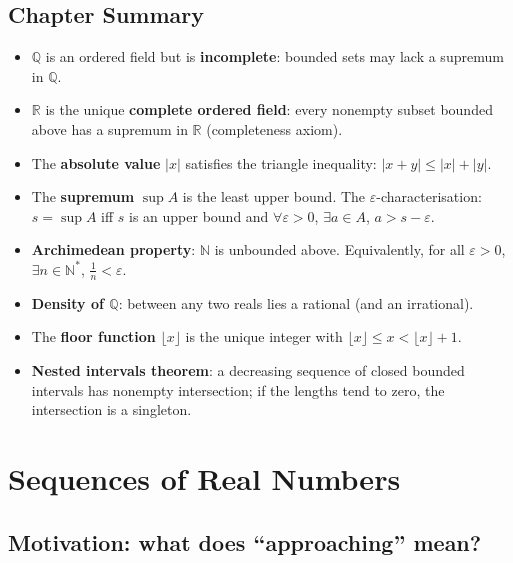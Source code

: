 \documentclass[12pt,a4paper,openany]{book}
\newcommand{\N}{\mathbb{N}}
\newcommand{\Q}{\mathbb{Q}}
\newcommand{\R}{\mathbb{R}}
\newcommand{\eps}{\varepsilon}
\newcommand{\abs}[1]{\left\lvert #1 \right\rvert}
\theoremstyle{definition}
\theoremstyle{remark}
\begin{document}
\section*{Chapter Summary}

\begin{chaptersummary}
\begin{itemize}[leftmargin=1.5em]
  \item $\Q$ is an ordered field but is \textbf{incomplete}: bounded sets
    may lack a supremum in $\Q$.
  \item $\R$ is the unique \textbf{complete ordered field}: every nonempty
    subset bounded above has a supremum in $\R$ (completeness axiom).
  \item The \textbf{absolute value} $\abs{x}$ satisfies the triangle
    inequality: $\abs{x+y}\leq\abs{x}+\abs{y}$.
  \item The \textbf{supremum} $\sup A$ is the least upper bound.  The
    $\eps$-characterisation: $s = \sup A$ iff $s$ is an upper bound and
    $\forall\eps>0$, $\exists a\in A$, $a>s-\eps$.
  \item \textbf{Archimedean property}: $\N$ is unbounded above.
    Equivalently, for all $\eps>0$, $\exists n \in \N^*$,
    $\frac{1}{n}<\eps$.
  \item \textbf{Density of $\Q$}: between any two reals lies a rational
    (and an irrational).
  \item The \textbf{floor function} $\lfloor x \rfloor$ is the unique
    integer with $\lfloor x\rfloor \leq x < \lfloor x\rfloor+1$.
  \item \textbf{Nested intervals theorem}: a decreasing sequence of closed
    bounded intervals has nonempty intersection; if the lengths tend to zero,
    the intersection is a singleton.
\end{itemize}
\end{chaptersummary}
\chapter{Sequences of Real Numbers}\label{ch:sequences}

\section*{Motivation: what does ``approaching'' mean?}
\end{document}
